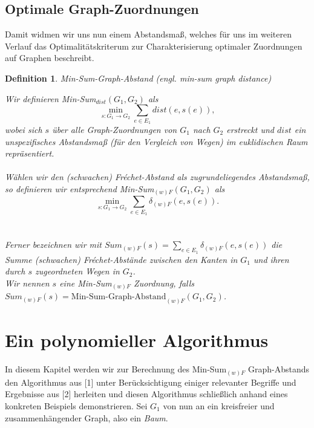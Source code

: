 \documentclass[a4paper, 12pt, twoside]{article}
\theoremstyle{Format1} %
\newtheorem{Def}{Definition}[section]       %
\begin{document}
\subsection{Optimale Graph-Zuordnungen} \label{Optimale Graphzuordnungen}
Damit widmen wir uns nun einem Abstandsmaß, welches für uns im weiteren Verlauf das Optimalitätskriterum zur Charakterisierung optimaler Zuordnungen auf Graphen beschreibt.

\begin{Def} \label{Definition Min-Sum}
	Min-Sum-Graph-Abstand (engl. min-sum graph distance)

	Wir definieren \textit{Min-Sum}$_{dist}(G_1, G_2)$ als
	$$\min_{s: G_1 \to G_2} \sum_{e \in E_1} dist(e, s(e)),$$
	wobei sich $s$ über alle Graph-Zuordnungen von $G_1$ nach $G_2$ erstreckt und $dist$ ein unspezifisches Abstandsmaß (für den Vergleich von Wegen)
	im euklidischen Raum repräsentiert.
	\\
	\\
	Wählen wir den (schwachen) Fréchet-Abstand als zugrundeliegendes Abstandsmaß, so definieren wir entsprechend
	\textit{Min-Sum}$_{(w)F}(G_1, G_2)$ als $$\min_{s: G_1 \to G_2} \sum_{e \in E_1} \delta_{(w)F}(e, s(e)).$$
	\\
	\\
	Ferner bezeichnen wir mit $Sum_{(w)F}(s) = \sum_{e \in E_1}\delta_{(w)F}(e, s(e))$ die Summe (schwachen) Fréchet-Abstände zwischen den Kanten
	in $G_1$ und ihren durch $s$ zugeordneten Wegen in $G_2$.
	\\
	Wir nennen $s$ eine Min-Sum$_{(w)F}$ Zuordnung, falls
	\\
	$Sum_{(w)F}(s) = \text{Min-Sum-Graph-Abstand}_{(w)F}(G_1,G_2)$.

\end{Def}

\section{Ein polynomieller Algorithmus}

In diesem Kapitel werden wir zur Berechnung des Min-Sum$_{(w)F}$ Graph-Abstands den Algorithmus aus [1] unter Berücksichtigung einiger relevanter
Begriffe und Ergebnisse aus [2] herleiten und diesen Algorithmus schließlich anhand eines konkreten Beispiels demonstrieren.
Sei $G_1$ von nun an ein kreisfreier und zusammenhängender Graph, also ein \textit{Baum}.
\end{document}
